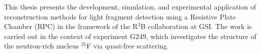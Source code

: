 
%







This thesis presents the development, simulation, and experimental application of reconstruction methods for light fragment detection using a Resistive Plate Chamber (RPC) in the framework of the R$^3$B collaboration at GSI. The work is carried out in the context of experiment G249, which investigates the structure of the neutron-rich nucleus $^{25}$F via quasi-free scattering.

